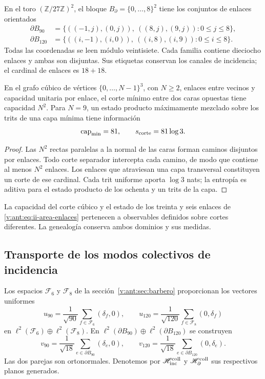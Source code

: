 En el toro \((\mathbb Z/27\mathbb Z)^2\), el bloque
\(B_\partial=\{0,\ldots,8\}^2\) tiene los conjuntos de enlaces
orientados
\begin{align}
 \partial B_{90}
 &=\{((-1,j),(0,j)),\ ((8,j),(9,j)):0\le j\le8\},\\
 \partial B_{120}
 &=\{((i,-1),(i,0)),\ ((i,8),(i,9)):0\le i\le8\}.
 \label{v:ant:eq:ii-area-enlaces}
\end{align}
Todas las coordenadas se leen módulo veintisiete. Cada familia contiene
dieciocho enlaces y ambas son disjuntas. Sus etiquetas conservan los
canales de incidencia; el cardinal de enlaces es \(18+18\).

\begin{theorem}
\label{v:ant:thm:ii-area-corte-minimo}
En el grafo cúbico de vértices \(\{0,\ldots,N-1\}^3\), con
\(N\ge2\), enlaces entre vecinos y capacidad unitaria por enlace,
el corte mínimo entre dos caras opuestas tiene capacidad \(N^2\).
Para \(N=9\), un estado producto máximamente mezclado sobre los
trits de una capa mínima tiene información
\begin{equation}
 \operatorname{cap}_{\min}=81,\qquad s_{\rm corte}=81\log3.
 \label{v:ant:eq:ii-area-corte-informacion}
\end{equation}
\end{theorem}
\begin{proof}
Las \(N^2\) rectas paralelas a la normal de las caras forman caminos
disjuntos por enlaces. Todo corte separador intercepta cada camino, de
modo que contiene al menos \(N^2\) enlaces. Los enlaces que atraviesan
una capa transversal constituyen un corte de ese cardinal. Cada trit
uniforme aporta \(\log3\) nats; la entropía es aditiva para el estado
producto de los ochenta y un trits de la capa.
\end{proof}

La capacidad del corte cúbico y el estado de los treinta y seis enlaces
de \eqref{v:ant:eq:ii-area-enlaces} pertenecen a observables definidos sobre
cortes diferentes. La genealogía conserva ambos dominios y sus medidas.

\subsection{Transporte de los modos colectivos de incidencia}
\label{v:ant:sec:ii-area-transporte-colectivo}

Los espacios \(\mathcal F_6\) y \(\mathcal F_8\) de la
sección~\ref{v:ant:sec:barbero} proporcionan los vectores uniformes
\[
 u_{90}=\frac1{\sqrt{90}}\sum_{f\in\mathcal F_6}(\delta_f,0),
 \qquad
 u_{120}=\frac1{\sqrt{120}}\sum_{f\in\mathcal F_8}(0,\delta_f)
\]
en \(\ell^2(\mathcal F_6)\oplus\ell^2(\mathcal F_8)\).
En \(\ell^2(\partial B_{90})\oplus\ell^2(\partial B_{120})\)
se construyen
\[
 v_{90}=\frac1{\sqrt{18}}\sum_{e\in\partial B_{90}}(\delta_e,0),
 \qquad
 v_{120}=\frac1{\sqrt{18}}\sum_{e\in\partial B_{120}}(0,\delta_e).
\]
Las dos parejas son ortonormales. Denotemos por
\(\mathscr H_{\rm inc}^{\rm coll}\) y
\(\mathscr H_\partial^{\rm coll}\) sus respectivos planos generados.

